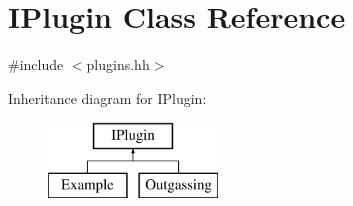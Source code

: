 \hypertarget{classIPlugin}{\section{I\-Plugin Class Reference}
\label{classIPlugin}
}


{\ttfamily \#include $<$plugins.\-hh$>$}

Inheritance diagram for I\-Plugin\-:\begin{figure}[H]
\begin{center}
\leavevmode
\includegraphics[height=2.000000cm]{classIPlugin}
\end{center}
\end{figure}
